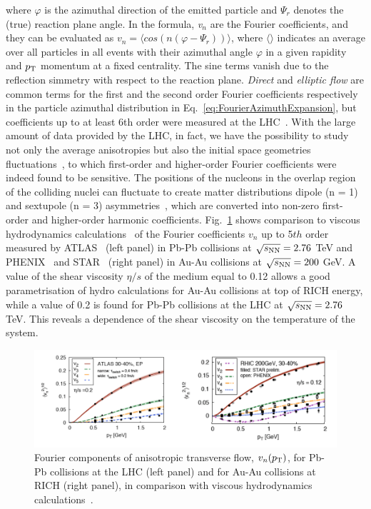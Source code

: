 where $\varphi$ is the azimuthal direction of the emitted particle and 
$\Psi_r$ denotes the (true) reaction plane angle.
In the formula, {\it v$_n$} are the Fourier coefficients, and they can be 
evaluated as $v_n = \langle cos(n(\varphi - \Psi_r)) \rangle$, where 
$\langle \rangle$ indicates an average over all particles in all events with
 their azimuthal angle $\varphi$ in a given rapidity and $p_{\rm T}$ momentum at
  a fixed centrality. The sine terms vanish due to the reflection simmetry 
  with respect to the reaction plane. {\it Direct} and {\it elliptic flow} 
  are common terms for the first and the
second order Fourier coefficients respectively in the particle azimuthal 
distribution in Eq.~\ref{eq:FourierAzimuthExpansion}, but coefficients 
up to at least 6th order were measured at the LHC~\cite{ATLAS:2012at}.
With the large amount of data provided by the LHC, in fact, we have the possibility
to study not only the average anisotropies but also the initial space geometries 
fluctuations~\cite{Aad:2013xma,Schukraft:2012ah}, to which first-order and higher-order Fourier 
coefficients were indeed found to be sensitive. 
The positions of the nucleons in the overlap region of the colliding nuclei 
can fluctuate to create matter distributions dipole (n = 1) and
sextupole (n = 3) asymmetries~\cite{Teaney:2010vd,Alver:2010dn,Alver:2010gr}, which are converted into 
non-zero first-order and higher-order harmonic coefficients. 
Fig.~\ref{fig:vnHydro} shows
   comparison to viscous hydrodynamics calculations~\cite{Gale:2012rq} of the 
   Fourier coefficients $v_n$ up to 5$th$ order measured by ATLAS~\cite{ATLAS:2012at}
    (left panel) in Pb-Pb collisions at $\sqrt{s_{\rm NN}} = 2.76$ TeV and 
    PHENIX~\cite{Adare:2011tg} and STAR~\cite{Pandit:2012mq} 
    (right panel) in Au-Au collisions at $\sqrt{s_{\rm NN}} = 200 $ GeV. A value
     of the shear viscosity $\eta/s$ of the medium equal to 0.12 allows a good parametrisation 
     of hydro calculations for Au-Au collisions at top of RICH energy, while a value of 0.2 is found
      for Pb-Pb collisions at the LHC at $\sqrt{s_{\rm NN}} = 2.76$ TeV.
      This reveals a dependence of the shear viscosity on the temperature of the system.
\begin{figure}[!ht]
  \centering
  \includegraphics[width=15cm]{FigCap1/RICH_ATLAS_vn.png}
  \caption{Fourier components of anisotropic transverse flow, $v_n(p_{\rm T})$, for Pb-Pb collisions at the LHC (left panel) and for Au-Au collisions at RICH (right panel), in comparison with viscous hydrodynamics calculations~\cite{Gale:2012rq}.}
  \label{fig:vnHydro}
\end{figure}
